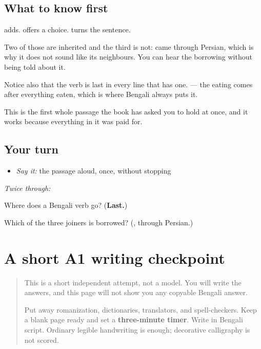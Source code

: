 \subsection*{What to know first}
\textbf{} adds. \textbf{} offers a choice. \textbf{} turns the sentence.

Two of those are inherited and the third is not: \textbf{} came through Persian, which is why it does not sound like its neighbours. You can hear the borrowing without being told about it.

Notice also that the verb is last in every line that has one. \textbf{    } — the eating comes after everything eaten, which is where Bengali always puts it.

This is the first whole passage the book has asked you to hold at once, and it works because everything in it was paid for.

\subsection*{Your turn}
\begin{itemize}
\raggedright
  \item \emph{Say it:} the passage aloud, once, without stopping
\end{itemize}

\emph{Twice through:}

\begin{tcolorbox}[breakable,colback=teal!4,colframe=teal!35!black,title={Before you move on}]
Where does a Bengali verb go? (\textbf{Last.})

Which of the three joiners is borrowed? (\textbf{}, through Persian.)
\end{tcolorbox}
\section[(short timed A1 writing checkpoint)]{A short A1 writing checkpoint}

\label{lesson:BN-W40-a1-timed-production}



\begin{quote}
This is a short independent attempt, not a model. You will write the answers, and this page will not show you any copyable Bengali answer.

Put away romanization, dictionaries, translators, and spell-checkers. Keep a blank page ready and set a \textbf{three-minute timer}. Write in Bengali script. Ordinary legible handwriting is enough; decorative calligraphy is not scored.
\end{quote}

